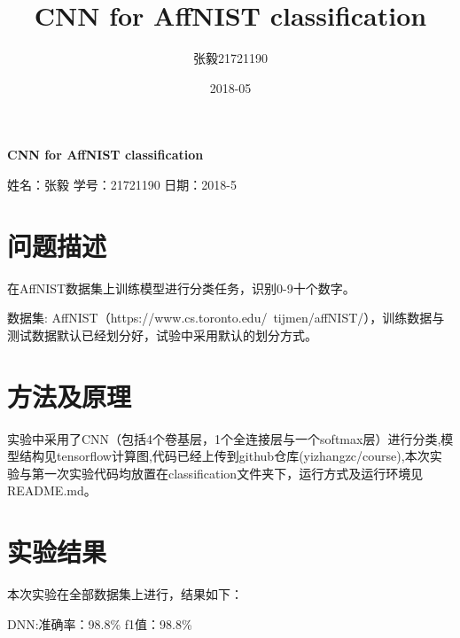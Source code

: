 \documentclass[a4paper]{article}
\title{CNN for AffNIST classification}
\date{2018-05}
\author{张毅\hspace{1em}21721190}
\begin{document}
    
    \begin{center}
        \doublespacing
        
        \Large \textbf{CNN for AffNIST classification}

        \normalsize 姓名：张毅 \qquad 学号：21721190 \qquad 日期：2018-5
    \end{center}

    \section{问题描述}

    在AffNIST数据集上训练模型进行分类任务，识别0-9十个数字。

    数据集: AffNIST（https://www.cs.toronto.edu/~tijmen/affNIST/），训练数据与测试数据默认已经划分好，试验中采用默认的划分方式。

    \section{方法及原理}

    实验中采用了CNN（包括4个卷基层，1个全连接层与一个softmax层）进行分类,模型结构见tensorflow计算图,代码已经上传到github仓库(yizhangzc/course),本次实验与第一次实验代码均放置在classification文件夹下，运行方式及运行环境见README.md。

    \section{实验结果}

    本次实验在全部数据集上进行，结果如下：

        \begin{center}
            DNN:\qquad 准确率：98.8\% \qquad f1值：98.8\%
        \end{center}
\end{document}
